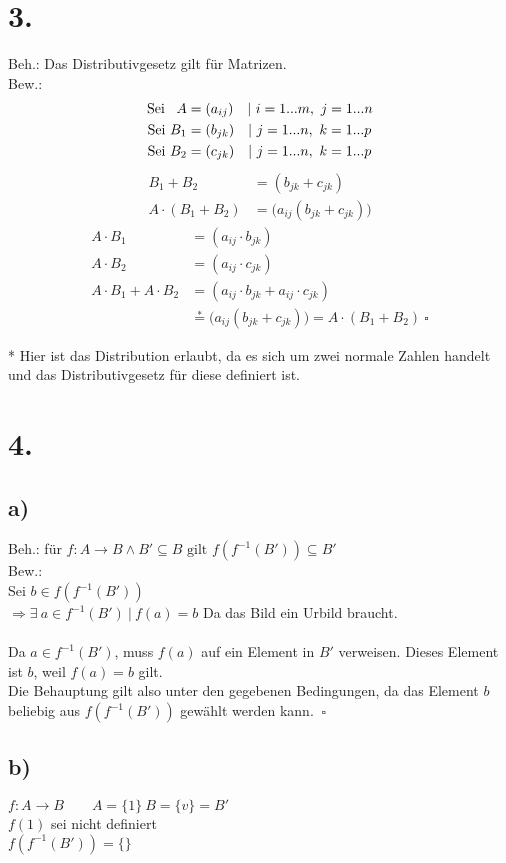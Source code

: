 \documentclass[a4paper]{scrartcl}
\newcommand{\qed}{\ \square}
\begin{document}
\section{3.}
	Beh.: Das Distributivgesetz gilt für Matrizen. \\
	Bew.: \\
	\begin{align}
		\text{Sei \ \,}A &= (a_{ij}) \quad |\ i= 1...m,\ j=1...n \\
		\text{Sei }B_1 &= (b_{jk}) \quad |\ j=1...n,\ k=1...p \\
		\text{Sei }B_2 &= (c_{jk}) \quad |\ j=1...n,\ k=1...p
	\end{align}
	\begin{align}
		B_1+B_2 &= (b_{jk}+c_{jk}) \\
		A\cdot(B_1+B_2) &= \Big(a_{ij}(b_{jk}+c_{jk})\Big)
	\end{align}
	\begin{align}
		A\cdot B_1 &= (a_{ij}\cdot b_{jk}) \\
		A\cdot B_2 &= (a_{ij}\cdot c_{jk}) \\
		A\cdot B_1+A\cdot B_2 &= (a_{ij}\cdot b_{jk} + a_{ij}\cdot c_{jk}) \\
		&\overset{*}{=} \Big(a_{ij}(b_{jk}+c_{jk})\Big) = A\cdot(B_1+B_2) \qed
	\end{align}
	\begin{small}
		 * Hier ist das Distribution erlaubt, da es sich um zwei normale Zahlen handelt und das 
		 Distributivgesetz für diese definiert ist.
	\end{small}	
	
\section{4.}	
	\subsection{a)}
		Beh.: für \(f:A\rightarrow B \land B'\subseteq B \text{ gilt } f(f^{-1}(B'))\subseteq B'\)\\
		Bew.: \\
		Sei \(b\in f(f^{-1}(B'))\) \\
		\(\Rightarrow \exists\ a\in f^{-1}(B')\ |\ f(a)=b\) Da das Bild ein Urbild braucht. \\ \\
		Da \(a\in f^{-1}(B')\), muss \(f(a)\) auf ein Element in \(B'\) verweisen. Dieses Element 
		ist \(b\), weil \(f(a)=b\) gilt. \\
		Die Behauptung gilt also unter den gegebenen Bedingungen, da das Element \(b\) beliebig aus 
		\(f(f^{-1}(B'))\) gewählt werden kann. \(\qed\)

	\subsection{b)}
		\(f:A\rightarrow B\quad\quad A=\{1\}\ B=\{v\}=B'\) \\
		\(f(1)\) sei nicht definiert \\
		\(f(f^{-1}(B'))=\{\}\) \\
		
	
\end{document}
